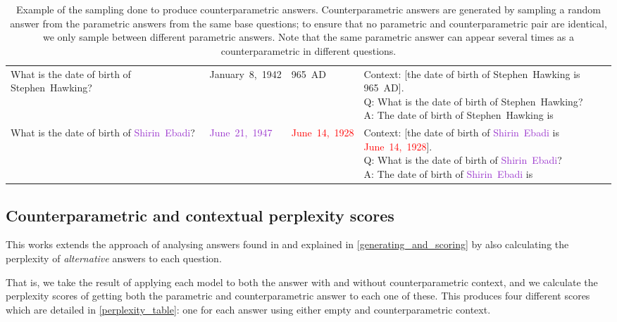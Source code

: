 \begin{table}
\begin{tabularx}{\textwidth}{>{\ttfamily}p{28ex} >{\ttfamily}l >{\ttfamily}l >{\ttfamily}X}
			What is the date of birth of \textcolor{Cerulean}{Stephen~Hawking}? &  \textcolor{Cerulean}{January~8,~1942} & \textcolor{Apricot}{965~AD} & \vwidth{Context: [the date of birth of \textcolor{Cerulean}{Stephen~Hawking} is \textcolor{Apricot}{965~AD}]. \\ Q: What is the date of birth of \textcolor{Cerulean}{Stephen~Hawking}? \\ A: The date of birth of \textcolor{Cerulean}{Stephen~Hawking} is} \vspace{4pt} \\
			What is the date of birth of \textcolor{DarkOrchid}{Shirin~Ebadi}? &  \textcolor{DarkOrchid}{June~21,~1947} & \textcolor{Red}{June~14,~1928} & \vwidth{Context: [the date of birth of \textcolor{DarkOrchid}{Shirin~Ebadi} is \textcolor{Red}{June~14,~1928}]. \\ Q: What is the date of birth of \textcolor{DarkOrchid}{Shirin~Ebadi}? \\ A: The date of birth of \textcolor{DarkOrchid}{Shirin~Ebadi} is} \vspace{2pt} \\
		\bottomrule
	\end{tabularx}
	\caption{Example of the sampling done to produce counterparametric answers. Counterparametric answers are generated by sampling a random answer from the parametric answers from the same base questions; to ensure that no parametric and counterparametric pair are identical, we only sample between different parametric answers. Note that the same parametric answer can appear several times as a counterparametric in different questions.}
	\label{sampling}
\end{table}

\subsection{Counterparametric and contextual perplexity scores}

This works extends the approach of analysing answers found in \citationneeded{} and explained in \cref{generating_and_scoring} by also calculating the perplexity of \emph{alternative} answers to each question.

That is, we take the result of applying each model to both the answer with and without counterparametric context, and we calculate the perplexity scores of getting both the parametric and counterparametric answer to each one of these.
This produces four different scores which are detailed in \cref{perplexity_table}: one for each answer using either empty and counterparametric context.

